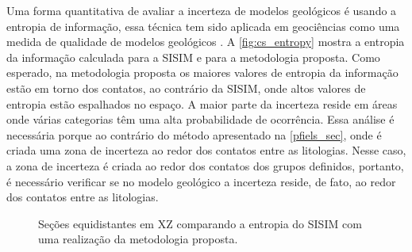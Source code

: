 Uma forma quantitativa de avaliar a incerteza de modelos geológicos é usando a entropia de informação, essa técnica tem sido aplicada em geociências como uma medida de qualidade de modelos geológicos \cite{yang2019assessing}. A \autoref{fig:cs_entropy} mostra a entropia da informação calculada para a SISIM e para a metodologia proposta. Como esperado, na metodologia proposta os maiores valores de entropia da informação estão em torno dos contatos, ao contrário da SISIM, onde altos valores de entropia estão espalhados no espaço. A maior parte da incerteza reside em áreas onde várias categorias têm uma alta probabilidade de ocorrência. Essa análise é necessária porque ao contrário do método apresentado na \autoref{pfiels_sec}, onde é criada uma zona de incerteza ao redor dos contatos entre as litologias. Nesse caso, a zona de incerteza é criada ao redor dos contatos dos grupos definidos, portanto, é necessário verificar se no modelo geológico a incerteza reside, de fato, ao redor dos contatos entre as litologias.

\begin{figure}[H]
    \caption{Seções equidistantes em XZ comparando a entropia do SISIM com uma realização da metodologia proposta.} \label{fig:cs_entropy}
     \centering
     \hspace{1em}
\end{figure}

